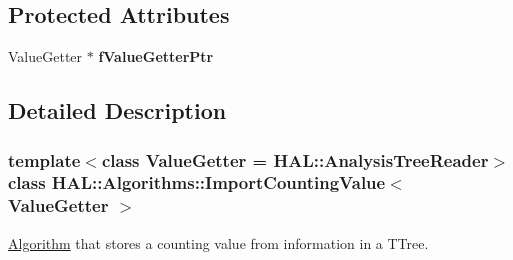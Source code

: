 \subsection*{Protected Attributes}
\begin{DoxyCompactItemize}
\item 
\hypertarget{class_h_a_l_1_1_algorithms_1_1_import_counting_value_ab93d369be3c197cadce57e1d5eb8a47e}{Value\+Getter $\ast$ {\bfseries f\+Value\+Getter\+Ptr}}\label{class_h_a_l_1_1_algorithms_1_1_import_counting_value_ab93d369be3c197cadce57e1d5eb8a47e}

\end{DoxyCompactItemize}


\subsection{Detailed Description}
\subsubsection*{template$<$class Value\+Getter = H\+A\+L\+::\+Analysis\+Tree\+Reader$>$class H\+A\+L\+::\+Algorithms\+::\+Import\+Counting\+Value$<$ Value\+Getter $>$}

\hyperlink{class_h_a_l_1_1_algorithm}{Algorithm} that stores a counting value from information in a T\+Tree. 

